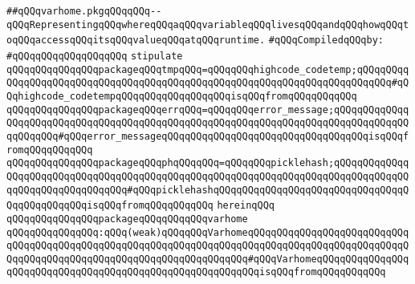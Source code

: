 \label{src/lib/compiler/front/typer-stuff/basics/varhome.pkg}
\verb|##qQQqvarhome.pkgqQQqqQQq--qQQqRepresentingqQQqwhereqQQqaqQQqvariableqQQqlivesqQQqandqQQqhowqQQqtoqQQqaccessqQQqitsqQQqvalueqQQqatqQQqruntime.|\newline
\newline
\verb|#qQQqCompiledqQQqby:|\newline
\verb|#qQQqqQQqqQQqqQQqqQQq|\newline
\newline
\newline
\newline
\verb|stipulate|\newline
\verb|qQQqqQQqqQQqqQQqpackageqQQqtmpqQQq=qQQqqQQqhighcode_codetemp;qQQqqQQqqQQqqQQqqQQqqQQqqQQqqQQqqQQqqQQqqQQqqQQqqQQqqQQqqQQqqQQqqQQqqQQqqQQq#qQQqhighcode_codetempqQQqqQQqqQQqqQQqqQQqisqQQqfromqQQqqQQqqQQq|\newline
\verb|qQQqqQQqqQQqqQQqpackageqQQqerrqQQq=qQQqqQQqerror_message;qQQqqQQqqQQqqQQqqQQqqQQqqQQqqQQqqQQqqQQqqQQqqQQqqQQqqQQqqQQqqQQqqQQqqQQqqQQqqQQqqQQqqQQqqQQq#qQQqerror_messageqQQqqQQqqQQqqQQqqQQqqQQqqQQqqQQqqQQqisqQQqfromqQQqqQQqqQQq|\newline
\verb|qQQqqQQqqQQqqQQqpackageqQQqphqQQqqQQq=qQQqqQQqpicklehash;qQQqqQQqqQQqqQQqqQQqqQQqqQQqqQQqqQQqqQQqqQQqqQQqqQQqqQQqqQQqqQQqqQQqqQQqqQQqqQQqqQQqqQQqqQQqqQQqqQQqqQQq#qQQqpicklehashqQQqqQQqqQQqqQQqqQQqqQQqqQQqqQQqqQQqqQQqqQQqqQQqisqQQqfromqQQqqQQqqQQq|\newline
\verb|hereinqQQq|\newline
\newline
\verb|qQQqqQQqqQQqqQQqpackageqQQqqQQqqQQqvarhome|\newline
\verb|qQQqqQQqqQQqqQQq:qQQq(weak)qQQqqQQqVarhomeqQQqqQQqqQQqqQQqqQQqqQQqqQQqqQQqqQQqqQQqqQQqqQQqqQQqqQQqqQQqqQQqqQQqqQQqqQQqqQQqqQQqqQQqqQQqqQQqqQQqqQQqqQQqqQQqqQQqqQQqqQQqqQQqqQQqqQQqqQQq#qQQqVarhomeqQQqqQQqqQQqqQQqqQQqqQQqqQQqqQQqqQQqqQQqqQQqqQQqqQQqqQQqqQQqisqQQqfromqQQqqQQqqQQq|\newline
